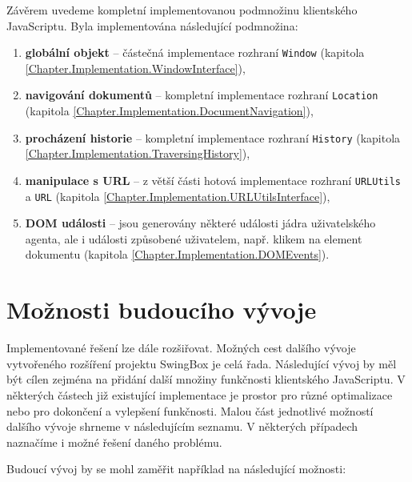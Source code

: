 Závěrem uvedeme kompletní implementovanou podmnožinu klientského JavaScriptu. Byla implementována následující podmnožina:

\begin{enumerate}
  \item \textbf{globální objekt} -- částečná implementace rozhraní \texttt{Window} (kapitola \ref{Chapter.Implementation.WindowInterface}),
  \item \textbf{navigování dokumentů} -- kompletní implementace rozhraní \texttt{Location} (kapitola \ref{Chapter.Implementation.DocumentNavigation}),
  \item \textbf{procházení historie} -- kompletní implementace rozhraní \texttt{History} (kapitola \ref{Chapter.Implementation.TraversingHistory}),
  \item \textbf{manipulace s URL} -- z větší části hotová implementace rozhraní \texttt{URLUtils} a \texttt{URL} (kapitola \ref{Chapter.Implementation.URLUtilsInterface}),
  \item \textbf{DOM události} -- jsou generovány některé události jádra uživatelského agenta, ale i události způsobené uživatelem, např. klikem na element dokumentu (kapitola \ref{Chapter.Implementation.DOMEvents}).
\end{enumerate}

\section{Možnosti budoucího vývoje}
\label{Chapter.PossibilitiesOfDevelopment}

Implementované řešení lze dále rozšiřovat. Možných cest dalšího vývoje vytvořeného rozšíření projektu SwingBox je celá řada. Následující vývoj by měl být cílen zejména na přidání další množiny funkčnosti klientského JavaScriptu. V některých částech již existující implementace je prostor pro různé optimalizace nebo pro dokončení a vylepšení funkčnosti. Malou část jednotlivé možností dalšího vývoje shrneme v následujícím seznamu. V některých případech naznačíme i možné řešení daného problému.

\bigskip \noindent Budoucí vývoj by se mohl zaměřit například na následující možnosti:

